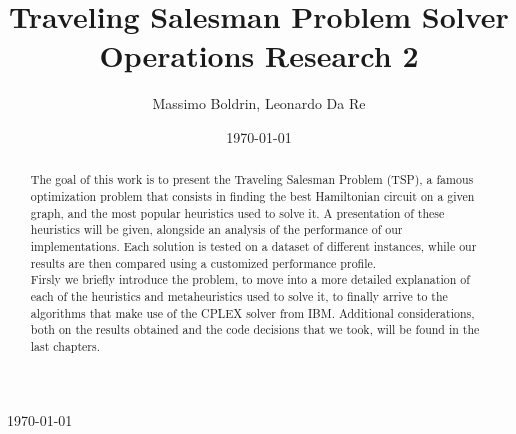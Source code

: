 \documentclass[a4paper]{report}
\begin{document}
\begin{titlepage}
	
	\vfill\vfill\vfill %
	
	{\large\today} %
	
	
	 
	
	\vfill %
	
\end{titlepage}


\title{Traveling Salesman Problem Solver \\ Operations Research 2} %

\author{Massimo Boldrin, Leonardo Da Re}

\date{\today}

\begin{abstract}
	The goal of this work is to present the Traveling Salesman Problem (TSP), a famous optimization
	problem that consists in finding the best Hamiltonian circuit on a given graph, and
	the most popular heuristics used to solve it. A presentation of these heuristics will be given, alongside an analysis of
	the performance of our implementations. Each solution is tested on a dataset of different instances, while our results are then
	compared using a customized performance profile.\\
	Firsly we briefly introduce the problem, to move into a more detailed explanation of each of the heuristics and metaheuristics used
	to solve it, to finally arrive to the algorithms that make use of the CPLEX solver from IBM.
	Additional considerations, both on the results obtained and the code decisions that we took, will be found in the last chapters.
\end{abstract}

\tableofcontents










\end{document}
